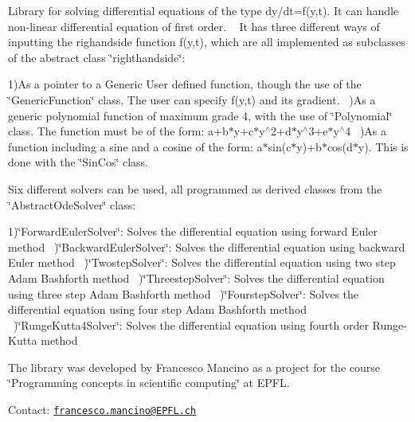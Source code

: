 Library for solving differential equations of the type dy/dt=f(y,t). It can handle non-\/linear differential equation of first order. ~\newline
 It has three different ways of inputting the righandside function f(y,t), which are all implemented as subclasses of the abstract class \char`\"{}righthandside\char`\"{}\+:

1)As a pointer to a Generic User defined function, though the use of the \char`\"{}\+Generic\+Function\char`\"{} class. The user can specify f(y,t) and its gradient. ~)As a generic polynomial function of maximum grade 4, with the use of \char`\"{}\+Polynomial\char`\"{} class. The function must be of the form\+: a+b$\ast$y+c$\ast$y$^\wedge$2+d$\ast$y$^\wedge$3+e$\ast$y$^\wedge$4 ~)As a function including a sine and a cosine of the form\+: a$\ast$sin(c$\ast$y)+b$\ast$cos(d$\ast$y). This is done with the \char`\"{}\+Sin\+Cos\char`\"{} class. ~\newline


Six different solvers can be used, all programmed as derived classes from the \char`\"{}\+Abstract\+Ode\+Solver\char`\"{} class\+:

1)\char`\"{}\+Forward\+Euler\+Solver\char`\"{}\+: Solves the differential equation using forward Euler method ~)\char`\"{}\+Backward\+Euler\+Solver\char`\"{}\+: Solves the differential equation using backward Euler method ~)\char`\"{}\+Twostep\+Solver\char`\"{}\+: Solves the differential equation using two step Adam Bashforth method ~)\char`\"{}\+Threestep\+Solver\char`\"{}\+: Solves the differential equation using three step Adam Bashforth method ~)\char`\"{}\+Fourstep\+Solver\char`\"{}\+: Solves the differential equation using four step Adam Bashforth method ~)\char`\"{}\+Runge\+Kutta4\+Solver\char`\"{}\+: Solves the differential equation using fourth order Runge-\/\+Kutta method ~\newline


The library was developed by Francesco Mancino as a project for the course \char`\"{}\+Programming concepts in scientific computing\char`\"{} at E\+P\+F\+L.

Contact\+: \href{mailto:francesco.mancino@EPFL.ch}{\tt francesco.\+mancino@\+E\+P\+F\+L.\+ch} 